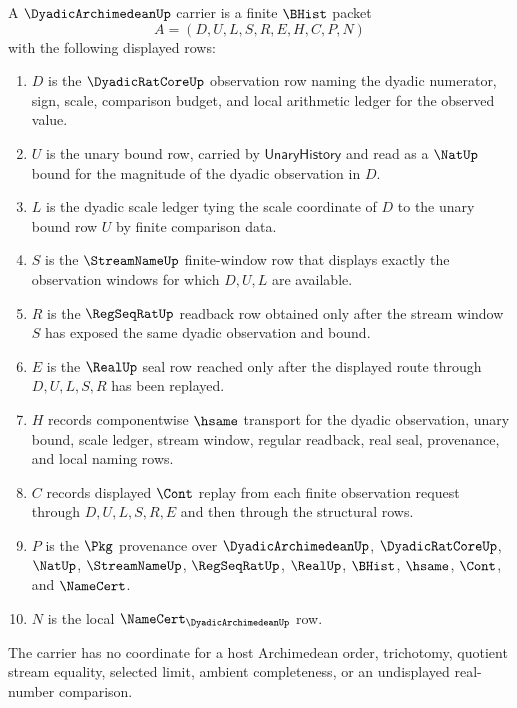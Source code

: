 \begin{definition}
\label{def:dyadic-archimedean-carrier}
A $\DyadicArchimedeanUp$ carrier is a finite $\BHist$ packet
$$
A=(D,U,L,S,R,E,H,C,P,N)
$$
with the following displayed rows:
\begin{enumerate}
\item $D$ is the $\DyadicRatCoreUp$ observation row naming the dyadic numerator, sign, scale, comparison budget, and local arithmetic ledger for the observed value.
\item $U$ is the unary bound row, carried by $\mathsf{UnaryHistory}$ and read as a $\NatUp$ bound for the magnitude of the dyadic observation in $D$.
\item $L$ is the dyadic scale ledger tying the scale coordinate of $D$ to the unary bound row $U$ by finite comparison data.
\item $S$ is the $\StreamNameUp$ finite-window row that displays exactly the observation windows for which $D,U,L$ are available.
\item $R$ is the $\RegSeqRatUp$ readback row obtained only after the stream window $S$ has exposed the same dyadic observation and bound.
\item $E$ is the $\RealUp$ seal row reached only after the displayed route through $D,U,L,S,R$ has been replayed.
\item $H$ records componentwise $\hsame$ transport for the dyadic observation, unary bound, scale ledger, stream window, regular readback, real seal, provenance, and local naming rows.
\item $C$ records displayed $\Cont$ replay from each finite observation request through $D,U,L,S,R,E$ and then through the structural rows.
\item $P$ is the $\Pkg$ provenance over $\DyadicArchimedeanUp$, $\DyadicRatCoreUp$, $\NatUp$, $\StreamNameUp$, $\RegSeqRatUp$, $\RealUp$, $\BHist$, $\hsame$, $\Cont$, and $\NameCert$.
\item $N$ is the local $\NameCert_{\DyadicArchimedeanUp}$ row.
\end{enumerate}
The carrier has no coordinate for a host Archimedean order, trichotomy, quotient stream equality, selected limit, ambient completeness, or an undisplayed real-number comparison.
\end{definition}

